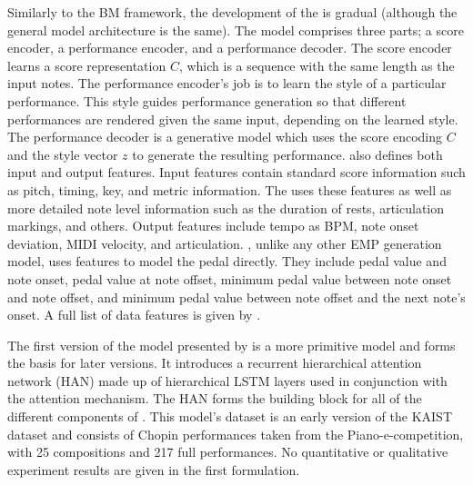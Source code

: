 Similarly to the BM framework, the development of the \vnetf{} is gradual (although the general model architecture is the same). The model comprises three parts; a score encoder, a performance encoder, and a performance decoder. The score encoder learns a score representation $C$, which is a sequence with the same length as the input notes. The performance encoder's job is to learn the style of a particular performance. This style guides performance generation so that different performances are rendered given the same input, depending on the learned style. The performance decoder is a generative model which uses the score encoding $C$ and the style vector $z$ to generate the resulting performance. \vnetf{} also defines both input and output features. Input features contain standard score information such as pitch, timing, key, and metric information. The \vnetf{} uses these features as well as more detailed note level information such as the duration of rests, articulation markings, and others. Output features include tempo as BPM, note onset deviation, MIDI velocity, and articulation. \vnetf{}, unlike any other EMP generation model, uses features to model the pedal directly. They include pedal value and note onset, pedal value at note offset, minimum pedal value between note onset and note offset, and minimum pedal value between note offset and the next note's onset. A full list of data features is given by \citet{jeong2019score}. 

The first version of the model presented by \citet{jeong2018virtuosonet} is a more primitive model and forms the basis for later versions. It introduces a recurrent hierarchical attention network (HAN) made up of hierarchical LSTM layers used in conjunction with the attention mechanism. The HAN forms the building block for all of the different components of \vnet{}. This model's dataset is an early version of the KAIST dataset and consists of Chopin performances taken from the Piano-e-competition, with 25 compositions and 217 full performances. No quantitative or qualitative experiment results are given in the first formulation. 

